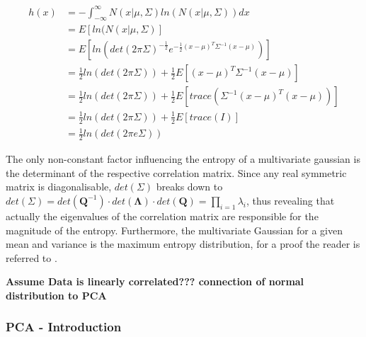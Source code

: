 \documentclass[a4paper, 11pt]{article}
\begin{document}
\begin{align*}
h(x) & = - \int_{-\infty}^{\infty} N(x|\mu, \Sigma)ln(N(x|\mu, \Sigma))dx \\
& = E[ln(N(x|\mu, \Sigma)] \\
& = E[ln(det(2\pi\Sigma)^{-\frac{1}{2}}e^{-\frac{1}{2}(x-\mu)^T\Sigma^{-1}(x-\mu)})] \\
& = \frac{1}{2} ln(det(2\pi\Sigma)) + \frac{1}{2} E[(x-\mu)^T \Sigma^{-1}(x-\mu)]\\
& = \frac{1}{2} ln(det(2\pi\Sigma)) + \frac{1}{2} E[trace(\Sigma^{-1}(x-\mu)^T (x-\mu))]\\
& = \frac{1}{2} ln(det(2\pi\Sigma)) + \frac{1}{2} E[trace(I)]\\
& = \frac{1}{2} ln(det(2\pi e \Sigma))
\end{align*}

The only non-constant factor influencing the entropy of a multivariate gaussian is the determinant of the respective correlation matrix.
Since any real symmetric matrix is diagonalisable, $det(\Sigma)$ breaks down to $det(\Sigma) = det(\mathbf{Q}^{-1}) \cdot det(\mathbf{\Lambda})\cdot det(\mathbf{Q}) = \prod_{i = 1} \lambda_{i}$, thus revealing that actually the eigenvalues of the correlation matrix are responsible for the magnitude of the entropy.
Furthermore, the multivariate Gaussian for a given mean and variance is the maximum entropy distribution, for a proof the reader is referred to \cite{cover2012elements}.

\textbf{Assume Data is linearly correlated??? connection of normal distribution to PCA}

\subsubsection{PCA - Introduction}
\end{document}
